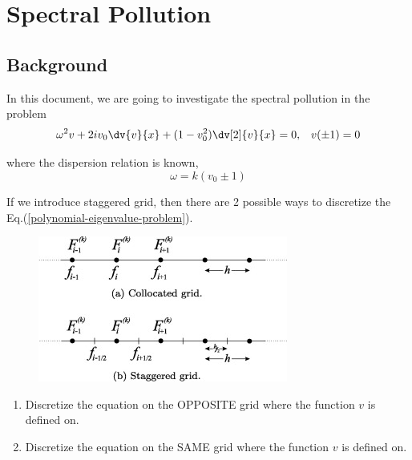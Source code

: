 \chapter{Spectral Pollution}
\section{Background}
In this document, we are going to investigate the spectral pollution in the problem
\begin{equation} \label{polynomial-eigenvalue-problem}
	\omega^2v + 2iv_0\dv{v}{x} + (1-v_0^2)\dv[2]{v}{x} = 0, \;\;\; v(\pm 1) = 0
\end{equation}

where the dispersion relation is known,
\begin{equation} \label{dispersion-relation}
	\omega = k(v_0 \pm 1) 
\end{equation}

If we introduce staggered grid, then there are 2 possible ways to discretize the Eq.(\ref{polynomial-eigenvalue-problem}).

\begin{figure}[H]
	\centering
	\includegraphics[width=0.7\linewidth]{img/staggered-grid.jpg}
\end{figure}

\begin{enumerate}
	\item Discretize the equation on the OPPOSITE grid where the function $v$ is defined on.
	\item Discretize the equation on the SAME grid where the function $v$ is defined on.
\end{enumerate}


